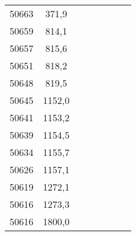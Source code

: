 \documentclass[11pt]{article}
\begin{document}
{{\begin{tabular}{|c|c|cc|c|c|cc}
            \cline{1-2} 
            50663 & 371,9 &  & \multicolumn{1}{c}{} & \multicolumn{1}{c}{} & \multicolumn{1}{c}{} &  & \tabularnewline
            \cline{1-2} 
            50659 & 814,1 &  & \multicolumn{1}{c}{} & \multicolumn{1}{c}{} & \multicolumn{1}{c}{} &  & \tabularnewline
            \cline{1-2} 
            50657 & 815,6 &  & \multicolumn{1}{c}{} & \multicolumn{1}{c}{} & \multicolumn{1}{c}{} &  & \tabularnewline
            \cline{1-2} 
            50651 & 818,2 &  & \multicolumn{1}{c}{} & \multicolumn{1}{c}{} & \multicolumn{1}{c}{} &  & \tabularnewline
            \cline{1-2} 
            50648 & 819,5 &  & \multicolumn{1}{c}{} & \multicolumn{1}{c}{} & \multicolumn{1}{c}{} &  & \tabularnewline
            \cline{1-2} 
            50645 & 1152,0 &  & \multicolumn{1}{c}{} & \multicolumn{1}{c}{} & \multicolumn{1}{c}{} &  & \tabularnewline
            \cline{1-2} 
            50641 & 1153,2 &  & \multicolumn{1}{c}{} & \multicolumn{1}{c}{} & \multicolumn{1}{c}{} &  & \tabularnewline
            \cline{1-2} 
            50639 & 1154,5 &  & \multicolumn{1}{c}{} & \multicolumn{1}{c}{} & \multicolumn{1}{c}{} &  & \tabularnewline
            \cline{1-2} 
            50634 & 1155,7 &  & \multicolumn{1}{c}{} & \multicolumn{1}{c}{} & \multicolumn{1}{c}{} &  & \tabularnewline
            \cline{1-2} 
            50626 & 1157,1 &  & \multicolumn{1}{c}{} & \multicolumn{1}{c}{} & \multicolumn{1}{c}{} &  & \tabularnewline
            \cline{1-2} 
            50619 & 1272,1 &  & \multicolumn{1}{c}{} & \multicolumn{1}{c}{} & \multicolumn{1}{c}{} &  & \tabularnewline
            \cline{1-2} 
            50616 & 1273,3 &  & \multicolumn{1}{c}{} & \multicolumn{1}{c}{} & \multicolumn{1}{c}{} &  & \tabularnewline
            \cline{1-2} 
            50616 & 1800,0 &  & \multicolumn{1}{c}{} & \multicolumn{1}{c}{} & \multicolumn{1}{c}{} &  & \tabularnewline
            \cline{1-2} 
        \end{tabular}
    }
}
\vspace*{\fill}
\end{document}
